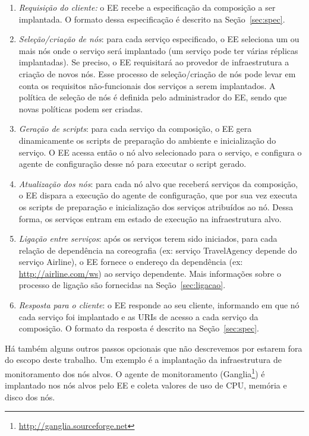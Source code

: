 \begin{enumerate}

\item \emph{Requisição do cliente:} o EE recebe a especificação da composição a ser implantada.
O formato dessa especificação é descrito na Seção~\ref{sec:spec}.

\item \emph{Seleção/criação de nós}: para cada serviço especificado, o EE seleciona um ou mais nós 
onde o serviço será implantado (um serviço pode ter várias réplicas implantadas). 
Se preciso, o EE requisitará ao provedor de infraestrutura a criação de novos nós.
Esse processo de seleção/criação de nós pode levar em conta os requisitos não-funcionais
dos serviços a serem implantados.
A política de seleção de nós é definida pelo administrador do EE, sendo que novas políticas podem ser criadas.

\item \emph{Geração de scripts}: para cada serviço da composição, 
o EE gera dinamicamente os scripts de preparação do ambiente e inicialização do serviço. 
O EE acessa então o nó alvo selecionado para o serviço,
e configura o agente de configuração desse nó para executar o script gerado.

\item \emph{Atualização dos nós}: para cada nó alvo que receberá serviços da composição,
o EE dispara a execução do agente de configuração, que por sua vez executa os scripts 
de preparação e inicialização dos serviços atribuídos ao nó.
Dessa forma, os serviços entram em estado de execução na infraestrutura alvo.

\item \emph{Ligação entre serviços}: após os serviços terem sido iniciados, 
para cada relação de dependência na coreografia (ex: serviço \textsf{TravelAgency}
depende do serviço \textsf{Airline}), o EE fornece o endereço da dependência 
(ex: \url{http://airline.com/ws}) ao serviço dependente.
Mais informações sobre o processo de ligação são fornecidas na Seção~\ref{sec:ligacao}.

\item \emph{Resposta para o cliente}: o EE responde ao seu cliente,
informando em que nó cada serviço foi implantado
e as URIs de acesso a cada serviço da composição.
O formato da resposta é descrito na Seção~\ref{sec:spec}.

\end{enumerate}

Há também alguns outros passos opcionais que não descrevemos por estarem fora
do escopo deste trabalho. Um exemplo é a implantação da infraestrutura de monitoramento
dos nós alvos. O agente de monitoramento 
(Ganglia\footnote{\url{http://ganglia.sourceforge.net}})
é implantado nos nós alvos pelo EE e
coleta valores de uso de CPU, memória e disco dos nós.


